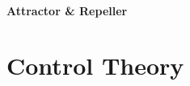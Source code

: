 \documentclass{article}
\begin{document}
\subsection{Attractor \& Repeller}\label{subsec:attractor_repeller}



\part{Control Theory}\label{sec:control_theory}
\end{document}
